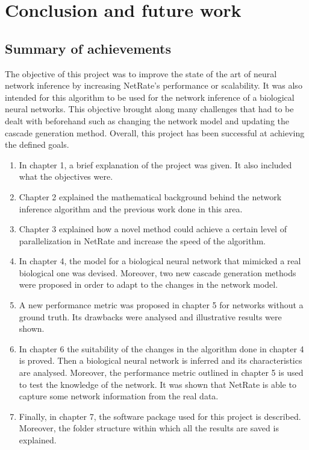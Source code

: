 
\chapter{Conclusion and future work}

\section{Summary of achievements}

The objective of this project was to improve the state of the art of neural network inference by increasing NetRate's performance or scalability. It was also intended for this algorithm to be used for the network inference of a biological neural networks. This objective brought along many challenges that had to be dealt with beforehand such as changing the network model and updating the cascade generation method. Overall, this project has been successful at achieving the defined goals. \\

\begin{enumerate}
\item In chapter 1, a brief explanation of the project was given. It also included what the objectives were. 
\item Chapter 2 explained the mathematical background behind the network inference algorithm and the previous work done in this area.
\item Chapter 3 explained how a novel method could achieve a certain level of parallelization in NetRate and increase the speed of the algorithm.
\item In chapter 4, the model for a biological neural network that mimicked a real biological one was devised. Moreover, two new cascade generation methods were proposed in order to adapt to the changes in the network model.
\item A new performance metric was proposed in chapter 5 for networks without a ground truth. Its drawbacks were analysed and illustrative results were shown.
\item In chapter 6 the suitability of the changes in the algorithm done in chapter 4 is proved. Then a biological neural network is inferred and its characteristics are analysed. Moreover, the performance metric outlined in chapter 5 is used to test the knowledge of the network. It was shown that NetRate is able to capture some network information from the real data.
\item Finally, in chapter 7, the software package used for this project is described. Moreover, the folder structure within which all the results are saved is explained.
\end{enumerate}

